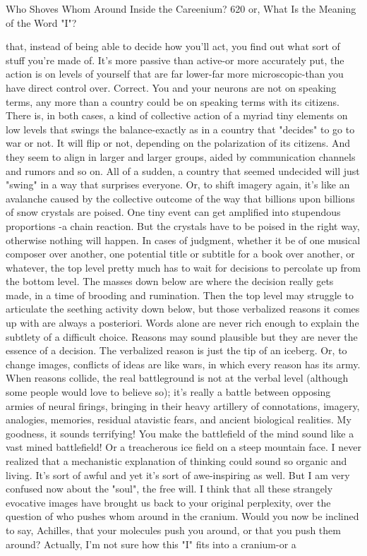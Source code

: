 Who Shoves Whom Around Inside the Careenium?                                        620
or, What Is the Meaning of the Word "I"?

  that, instead of being able to decide how you'll act, you find out what sort of stuff
  you're made of. It's more passive than active-or more accurately put, the action is
  on levels of yourself that are far lower-far more microscopic-than you have direct
  control over.
\tortoise Correct. You and your neurons are not on speaking terms, any more than
  a country could be on speaking terms with its citizens. There is, in both cases, a
  kind of collective action of a myriad tiny elements on low levels that swings the
  balance-exactly as in a country that "decides" to go to war or not. It will flip or not,
  depending on the polarization of its citizens. And they seem to align in larger and
  larger groups, aided by communication channels and rumors and so on. All of a
  sudden, a country that seemed undecided will just "swing" in a way that surprises
  everyone.
\achilles Or, to shift imagery again, it's like an avalanche caused by the collective
  outcome of the way that billions upon billions of snow crystals are poised. One
  tiny event can get amplified into stupendous proportions -a chain reaction. But the
  crystals have to be poised in the right way, otherwise nothing will happen.
\tortoise In cases of judgment, whether it be of one musical composer over
  another, one potential title or subtitle for a book over another, or whatever, the top
  level pretty much has to wait for decisions to percolate up from the bottom level.
  The masses down below are where the decision really gets made, in a time of
  brooding and rumination. Then the top level may struggle to articulate the seething
  activity down below, but those verbalized reasons it comes up with are always a
  posteriori. Words alone are never rich enough to explain the subtlety of a difficult
  choice. Reasons may sound plausible but they are never the essence of a decision.
  The verbalized reason is just the tip of an iceberg. Or, to change images, conflicts
  of ideas are like wars, in which every reason has its army. When reasons collide,
  the real battleground is not at the verbal level (although some people would love to
  believe so); it's really a battle between opposing armies of neural firings, bringing
  in their heavy artillery of connotations, imagery, analogies, memories, residual
  atavistic fears, and ancient biological realities.
\achilles My goodness, it sounds terrifying! You make the battlefield of the mind
  sound like a vast mined battlefield! Or a treacherous ice field on a steep mountain
  face. I never realized that a mechanistic explanation of thinking could sound so
  organic and living. It's sort of awful and yet it's sort of awe-inspiring as well. But I
  am very confused now about the "soul", the free will.
\tortoise I think that all these strangely evocative images have brought us back to
  your original perplexity, over the question of who pushes whom around in the
  cranium. Would you now be inclined to say, Achilles, that your molecules push
  you around, or that you push them around?
\achilles Actually, I'm not sure how this "I" fits into a cranium-or a




